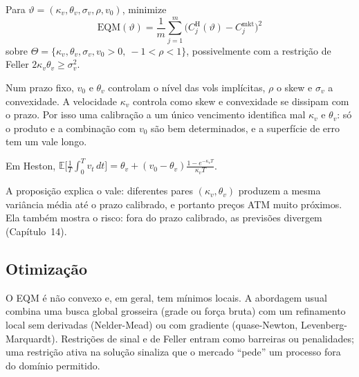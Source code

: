 \begin{definicao}
Para $\vartheta=(\kappa_v,\theta_v,\sigma_v,\rho,v_0)$, minimize
\begin{equation}
\mathrm{EQM}(\vartheta)=\frac1m\sum_{j=1}^m\big(C^{\mathrm H}_j(\vartheta)-C^{\mathrm{mkt}}_j\big)^2
\end{equation}
sobre $\Theta=\{\kappa_v,\theta_v,\sigma_v,v_0>0,\ -1<\rho<1\}$, possivelmente com a restrição de Feller $2\kappa_v\theta_v\ge\sigma_v^2$.
\end{definicao}

\begin{observacao}
Num prazo fixo, $v_0$ e $\theta_v$ controlam o nível das vols implícitas, $\rho$ o skew e $\sigma_v$ a convexidade. A velocidade $\kappa_v$ controla como skew e convexidade se dissipam com o prazo. Por isso uma calibração a um único vencimento identifica mal $\kappa_v$ e $\theta_v$: só o produto e a combinação com $v_0$ são bem determinados, e a superfície de erro tem um vale longo.
\end{observacao}

\begin{proposicao}
Em Heston, $\mathbb E\big[\tfrac1T\int_0^Tv_t\,dt\big]=\theta_v+(v_0-\theta_v)\frac{1-e^{-\kappa_vT}}{\kappa_vT}$.
\end{proposicao}

A proposição explica o vale: diferentes pares $(\kappa_v,\theta_v)$ produzem a mesma variância média até o prazo calibrado, e portanto preços ATM muito próximos. Ela também mostra o risco: fora do prazo calibrado, as previsões divergem (Capítulo~14).

\subsection{Otimização}

\begin{observacao}
O EQM é não convexo e, em geral, tem mínimos locais. A abordagem usual combina uma busca global grosseira (grade ou força bruta) com um refinamento local sem derivadas (Nelder-Mead) ou com gradiente (quase-Newton, Levenberg-Marquardt). Restrições de sinal e de Feller entram como barreiras ou penalidades; uma restrição ativa na solução sinaliza que o mercado ``pede'' um processo fora do domínio permitido.
\end{observacao}
